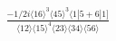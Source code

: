 \documentclass[varwidth, border=5pt]{standalone}
\begin{document}
\begin{my}
$\begin{gathered}
\scriptscriptstyle\frac{-1/2i\langle16\rangle^3\langle45\rangle^3\langle1|5+6|1]}{\langle12\rangle\langle15\rangle^4\langle23\rangle\langle34\rangle\langle56\rangle}
\end{gathered}$
\end{my}
\end{document}
